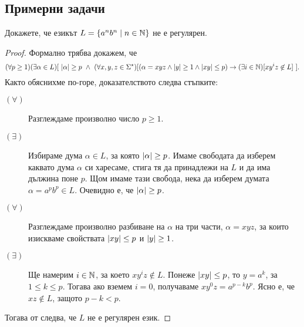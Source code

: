 \subsection{Примерни задачи}

\begin{problem}\label{prob:regular:pumping:an-bn}
  Докажете, че езикът $L = \{a^nb^n \mid n\in \mathbb{N}\}$ не е регулярен.
\end{problem}
\begin{proof}
  Формално трябва докажем, че
  {\scriptsize
    \[(\forall p \geq 1)(\exists \alpha \in L)[\ \abs{\alpha} \geq p\ \land\ (\forall x,y,z\in\Sigma^\star)[(\alpha = xyz \land \abs{y} \geq 1 \land \abs{xy} \leq p) \to (\exists i\in\Nat)[xy^iz \not\in L]\ ].\]}
  Както обяснихме по-горе, доказателството следва стъпките:
  \begin{description}
  \item[$(\forall)$]
    Разглеждаме произволно число $p \geq 1$.
  \item[$(\exists)$]
    Избираме дума $\alpha \in L$, за която $\vert{\alpha}\vert \geq p$. Имаме свободата да изберем каквато дума $\alpha$
    си харесаме, стига тя да принадлежи на $L$ и да има дължина поне $p$.
    Щом имаме тази свобода, нека да изберем думата $\alpha = a^pb^p \in L$.
    Очевидно е, че $\vert{\alpha}\vert \geq p$.
  \item[$(\forall)$]
    Разглеждаме произволно разбиване на $\alpha$ на три части, $\alpha = xyz$,
    за които изискваме свойствата $\vert{xy}\vert \leq p$ и $\vert{y}\vert \geq 1$.
  \item[$(\exists)$]
    Ще намерим $i\in\mathbb{N}$, за което $xy^iz \not\in L$.
    Понеже $\vert{xy}\vert \leq p$, то $y = a^k$, за  $1\leq k \leq p$.
    Тогава ако вземем $i = 0$, получаваме $xy^0z = a^{p-k}b^p$.
    Ясно е, че $xz \not\in L$, защото $p-k < p$.
  \end{description}  
  Тогава от  следва, че $L$ не е регулярен език.
\end{proof}

